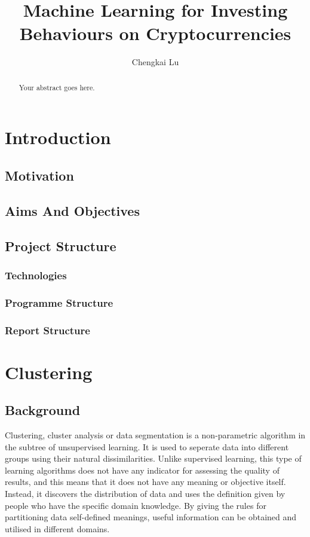 \documentclass[11pt]{article} %
\title{Machine Learning for Investing Behaviours on Cryptocurrencies}
\author{Chengkai Lu}
\theoremstyle{plain}
\theoremstyle{definition}
\begin{document}
\maketitle

\declaration

\begin{abstract}
  Your abstract goes here.
\end{abstract}

\section{Introduction}
\subsection{Motivation}
\subsection{Aims And Objectives}
\subsection{Project Structure}
\subsubsection{Technologies}
\subsubsection{Programme Structure}
\subsubsection{Report Structure}

\section{Clustering}
\subsection{Background}

Clustering, cluster analysis or data segmentation is a non-parametric algorithm in the subtree of unsupervised learning. It is used to seperate data into different groups using their natural dissimilarities. Unlike supervised learning, this type of learning algorithms does not have any indicator for assessing the quality of results, and this means that it does not have any meaning or objective itself. Instead, it discovers the distribution of data and uses the definition given by people who have the specific domain knowledge. By giving the rules for partitioning data self-defined meanings, useful information can be obtained and utilised in different domains\cite{hastie/etal:2009}.
\end{document}
